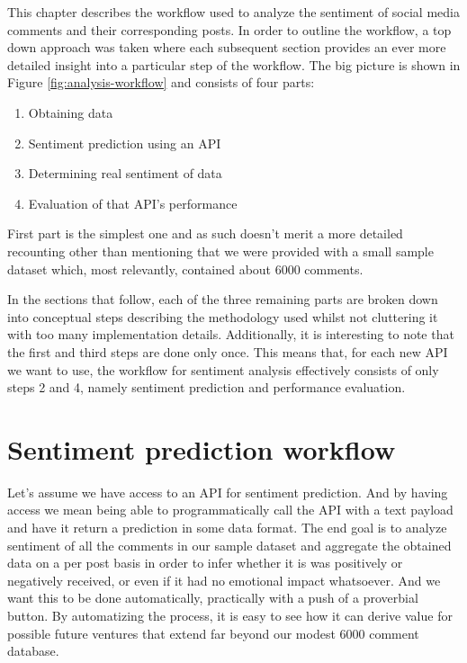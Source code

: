 This chapter describes the workflow used to analyze the sentiment of social media comments and their corresponding posts.
In order to outline the workflow, a top down approach was taken where each subsequent section provides an ever more detailed insight into a particular step of the workflow.
The big picture is shown in Figure \ref{fig:analysis-workflow} and consists of four parts:
\begin{enumerate}
  \item Obtaining data
  \item Sentiment prediction using an API
  \item Determining real sentiment of data
  \item Evaluation of that API's performance
\end{enumerate}

First part is the simplest one and as such doesn't merit a more detailed recounting other than mentioning that we were provided with a small sample dataset which, most relevantly, contained about 6000 comments.

In the sections that follow, each of the three remaining parts are broken down into conceptual steps describing the methodology used whilst not cluttering it with too many implementation details.
Additionally, it is interesting to note that the first and third steps are done only once.
This means that, for each new API we want to use, the workflow for sentiment analysis effectively consists of only steps 2 and 4, namely sentiment prediction and performance evaluation.





\section{Sentiment prediction workflow\label{sec:sentiment-prediction-workflow}}
Let's assume we have access to an API for sentiment prediction. And by having access we mean being able to programmatically call the API with a text payload and have it return a prediction in some data format. The end goal is to analyze sentiment of all the comments in our sample dataset and aggregate the obtained data on a per post basis in order to infer whether it is was positively or negatively received, or even if it had no emotional impact whatsoever. And we want this to be done automatically, practically with a push of a proverbial button. By automatizing the process, it is easy to see how it can derive value for possible future ventures that extend far beyond our modest 6000 comment database.

